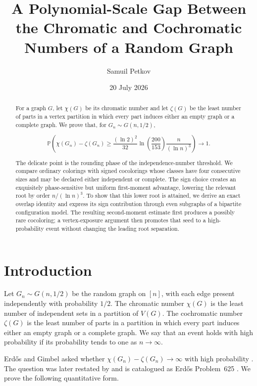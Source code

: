 \documentclass[11pt,reqno]{amsart}
\title[Chromatic and cochromatic numbers]{A Polynomial-Scale Gap Between the
Chromatic and Cochromatic Numbers of a Random Graph}
\author[Samuil Petkov]{Samuil Petkov}
\date{20 July 2026}
\newcommand{\Prob}[1]{\mathbb{P}\!\left(#1\right)}
\begin{document}
\begin{abstract}

For a graph \(G\), let \(\chi(G)\) be its chromatic number and
let \(\zeta(G)\) be the least number of parts in a vertex partition
in which every part induces either an empty graph or a complete graph.
We prove that, for \(G_n\sim G(n,1/2)\),

\[
 \Prob{\chi(G_n)-\zeta(G_n)
 \ge \frac{(\ln 2)^2}{32}\ln\!\left(\frac{200}{153}\right)
       \frac{n}{(\ln n)^3}}\longrightarrow1.             \tag{0.1}
\]

The delicate point is the rounding phase of the independence-number
threshold. We compare ordinary colorings with signed cocolorings whose
classes have four consecutive sizes and may be declared either independent
or complete. The sign choice creates an exquisitely phase-sensitive but
uniform first-moment advantage, lowering the relevant root by order
\(n/(\ln n)^3\). To show that this lower root is attained, we derive an exact
overlap identity and express its sign contribution through even subgraphs of
a bipartite configuration model. The resulting second-moment estimate first
produces a possibly rare cocoloring; a vertex-exposure argument then promotes
that seed to a high-probability event without changing the leading root
separation.

\end{abstract}

\maketitle

\section*{Introduction}\label{introduction}

Let \(G_n\sim G(n,1/2)\) be the random graph on \([n]\), with each edge
present independently with probability \(1/2\).  The chromatic number
\(\chi(G)\) is the least number of independent sets in a partition of
\(V(G)\).  The cochromatic number \(\zeta(G)\) is the least number of parts
in a partition in which every part induces either an empty graph or a
complete graph.  We say that an event holds with high probability if its
probability tends to one as \(n\to\infty\).

Erd\H{o}s and Gimbel asked whether
\(\chi(G_n)-\zeta(G_n)\to\infty\) with high probability
\citep[p.~263]{erdos-gimbel-1993}.  The question was later restated by
\citet[Section~7.4, p.~100]{gimbel-2016} and is catalogued as Erd\H{o}s
Problem~625 \citep{bloom-erdos625}.  We prove the following quantitative
form.
\end{document}
